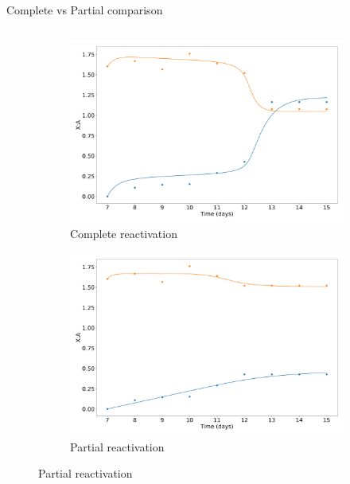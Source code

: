 \documentclass[aspectratio=169,9pt]{beamer}
\begin{document}
    \begin{frame}{Complete vs Partial comparison}
        \begin{columns}
            \begin{column}{0.75\textwidth}
                \begin{figure}[h]
                    \centering
                    \begin{subfigure}[b]{0.49\textwidth}
                        \centering
                        \includegraphics[width=\textwidth]{IIII-iPSC_timeshifted-timeseries}
                        \caption{Complete reactivation}
                    \end{subfigure}
                    \begin{subfigure}[b]{0.49\textwidth}
                        \centering
                        \includegraphics[width=\textwidth]{IIII-Partial_timeshifted-timeseries}
                        \caption{Partial reactivation}

\end{subfigure}
\end{figure}
\end{column}
\end{columns}
\end{frame}
\end{document}

